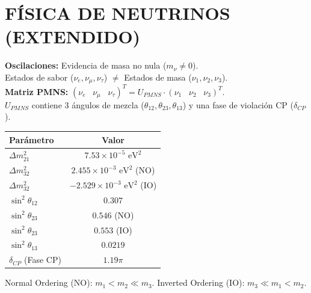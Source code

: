     \section{FÍSICA DE NEUTRINOS (EXTENDIDO)}
    \textbf{Oscilaciones:} Evidencia de masa no nula ($m_\nu \neq 0$).
    \\ Estados de sabor ($\nu_e, \nu_\mu, \nu_\tau$) $\neq$ Estados de masa ($\nu_1, \nu_2, \nu_3$).
    \\ \textbf{Matriz PMNS:} $(\nu_e \;\;\; \nu_\mu \;\;\; \nu_\tau)^T = U_{PMNS} \cdot (\nu_1 \;\;\; \nu_2 \;\;\; \nu_3)^T$.\\[2pt]
    $U_{PMNS}$ contiene 3 ángulos de mezcla ($\theta_{12}, \theta_{23}, \theta_{13}$) y una fase de violación CP ($\delta_{CP}$).

    \begin{center}
        \begin{tabular}{|l|c|}
            \hline
            \textbf{Parámetro}             & \textbf{Valor}               \\ \hline
            $\Delta m_{21}^2$              & $7.53 \times 10^{-5} \text{ eV}^2$        \\ \hline
            $\Delta m_{32}^2$            & $2.455 \times 10^{-3} \text{ eV}^2$ (NO) \\ \hline
            $\Delta m_{32}^2$            & $-2.529 \times 10^{-3} \text{ eV}^2$ (IO) \\ \hline
            $\sin^2 \theta_{12}$    & $0.307$                      \\ \hline
            $\sin^2 \theta_{23}$    & $0.546$ (NO)          \\ \hline
            $\sin^2 \theta_{23}$    & $0.553$ (IO)          \\ \hline
            $\sin^2 \theta_{13}$    & $0.0219 $                        \\ \hline
            $\delta_{CP}$ (Fase CP)        & $1.19\pi$         \\ \hline
        \end{tabular}
    \end{center}
    Normal Ordering (NO): $m_1 < m_2 \ll m_3$.\;\; Inverted Ordering (IO): $m_3 \ll m_1 < m_2$.

